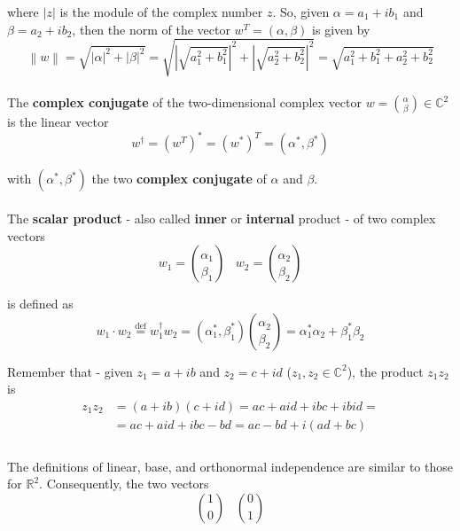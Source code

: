 \documentclass[a4paper,10pt]{article}
\newcommand\norm[1]{\left\lVert#1\right\rVert}
\begin{document}
where $|z|$ is the module of the complex number $z$. So, given $\alpha  = a_1 + ib_1$ and $\beta  = a_2 + ib_2$, then the norm of the vector $w^T = (\alpha, \beta)$ is given by
\begin{equation*}
\norm{w} = \sqrt{|\alpha|^2 + |\beta|^2} = \sqrt{\left|\sqrt{a_1^2 + b_1^2}\right|^2 + \left|\sqrt{a_2^2 + b_2^2}\right|^2} = \sqrt{a_1^2 + b_1^2 + a_2^2 + b_2^2}
\end{equation*}

\paragraph{} The \textbf{complex conjugate} of the two-dimensional complex vector $w = \binom{\alpha}{\beta} \in {\mathbb{C}}^2$ is the linear vector
\begin{equation}
w^\dagger = {(w^{T})}^{*} = {(w^{*})}^{T} = (\alpha^*, \beta^*)
\label{eq:twoDimensionalComplexVectorConjugate}
\end{equation}

with $(\alpha^*, \beta^*)$ the two \textbf{complex conjugate} of $\alpha$ and $\beta$.

\paragraph{} The \textbf{scalar product} - also called \textbf{inner} or \textbf{internal} product - of two complex vectors
$$w_1 = \binom{\alpha_1}{\beta_1} \; \; \; w_2 = \binom{\alpha_2}{\beta_2}$$

is defined as
\begin{equation}
w_1 \cdot w_2 \stackrel{\text{def}}{=} w_1^\dagger w_2 = (\alpha_1^*, \beta_1^*) \binom{\alpha_2}{\beta_2} = \alpha_1^* \alpha_2 + \beta_1^*\beta_2
\label{eq:complexVectorScalarProductInC2}
\end{equation}

Remember that - given $z_1 = a + ib$ and $z_2 = c + id$ ($z_1, z_2 \in {\mathbb{C}}^2$), the product $z_1 z_2$ is
\begin{equation*}
\begin{split}
z_1z_2 & = (a + ib) (c + id) = ac + aid + ibc + ibid = \\
 & = ac + aid + ibc - bd = ac - bd + i(ad + bc) \\
\end{split}
\end{equation*}

\paragraph{} The definitions of linear, base, and orthonormal independence are similar to those for ${\mathbb{R}}^2$.
Consequently, the two vectors
\begin{equation}
\binom{1}{0} \; \; \; \binom{0}{1}
\label{eq:canonicalBaseInC2}
\end{equation}
\end{document}
